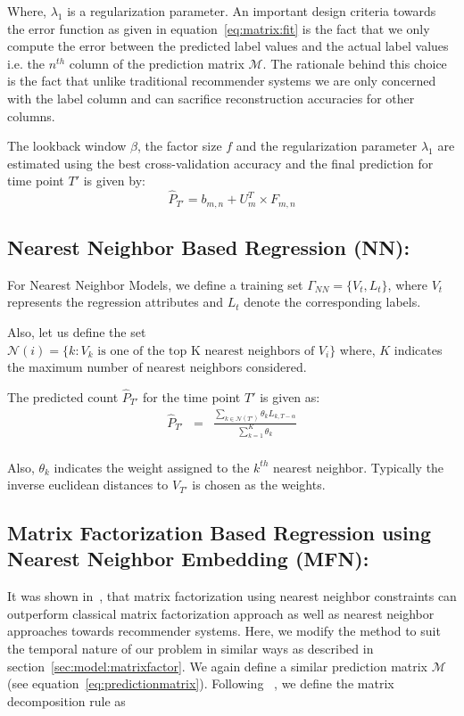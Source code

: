 Where, $\lambda_1$ is a regularization parameter. An important design criteria towards
the error function as given in equation~\ref{eq:matrix:fit} is the fact that we only compute the error
between the predicted label values and the actual label values i.e. the $n^{th}$ column of the prediction 
matrix $\mathcal{M}$. The rationale behind this choice is the fact that unlike traditional recommender 
systems we are only concerned with the label column and can sacrifice reconstruction accuracies for other 
columns. 

The lookback window $\beta$, the factor size $f$ and the regularization parameter $\lambda_1$ 
are estimated using the best cross-validation accuracy 
and the final prediction for time point $T'$ is given by:
\[\widehat{P}_{T'} = b_{m,n} + U_m^T \times F_{m,n} \]

\subsection{\label{sec:model:nearestneighbor} Nearest Neighbor Based Regression (NN):}
For Nearest Neighbor Models, we define a training set $\Gamma_{NN}
= \lbrace V_t, L_t \rbrace$, where $V_t$ represents the regression attributes
and $L_t$ denote the corresponding labels.

Also, let us define the set 
$\mathcal{N}(i) = \lbrace k : \mbox{$V_k$ is one of the top  K nearest neighbors of $V_{i}$} \rbrace$ 
where, $K$ indicates the maximum number of nearest neighbors considered.


The predicted count $\widehat{P}_{T'}$ for the time point $T'$ is given as:
\begin{equation} \label{eq:nearestneighbor:pred}
  \begin{array}{lcl}
    \widehat{P}_{T'} & = & \frac{\sum\limits_{k \in \mathcal{N}(T')} \theta_{k}L_{k,T - \alpha}}
    {\sum\limits_{k=1}^{K} \theta_{k}}\\
  \end{array}
\end{equation}

Also, $\theta_k$ indicates the weight assigned to the $k^{th}$ nearest neighbor.
Typically the inverse euclidean distances to $V_{T'}$ is chosen as the weights.

\subsection{\label{sec:model:nearestmatrix} Matrix Factorization Based
Regression using Nearest Neighbor Embedding (MFN):}
It was shown in~\cite{koren2008factor},  that matrix factorization using nearest neighbor constraints can
outperform classical matrix factorization approach as well as nearest neighbor approaches towards
recommender systems. Here, we modify the method to suit the temporal nature of our problem in similar ways 
as described in section~\ref{sec:model:matrixfactor}. We again define a similar prediction matrix $\mathcal{M}$ 
(see equation~\ref{eq:predictionmatrix}). Following ~\cite{koren2008factor}, we define the 
matrix decomposition rule as 

